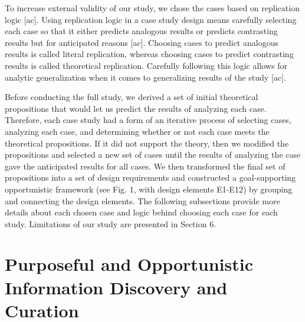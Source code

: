 \documentclass{casconpaper}
\begin{document}
{To increase external validity of our study, we chose the cases based on replication logic [ac]. Using replication logic in a case study design means carefully selecting each case so that it either predicts analogous results or predicts contrasting results but for anticipated reasons [ac]. Choosing cases to predict analogous results is called literal replication, whereas choosing cases to predict contrasting results is called theoretical replication. Carefully following this logic allows for analytic generalization when it comes to generalizing results of the study [ac].

Before conducting the full study, we derived a set of initial theoretical propositions that would let us predict the results of analyzing each case. Therefore, each case study had a form of an iterative process of selecting cases, analyzing each case, and determining whether or not each case meets the theoretical propositions. If it did not support the theory, then we modified the propositions and selected a new set of cases until the results of analyzing the case gave the anticipated results for all cases. We then transformed the final set of propositions into a set of design requirements and constructed a goal-supporting opportunistic framework (see Fig. 1, with design elements E1-E12) by grouping and connecting the design elements. The following subsections provide more details about each chosen case and logic behind choosing each case for each study. Limitations of our study are presented in Section 6.
} %
{\section{Purposeful and Opportunistic Information Discovery and Curation}

} %
\end{document}

